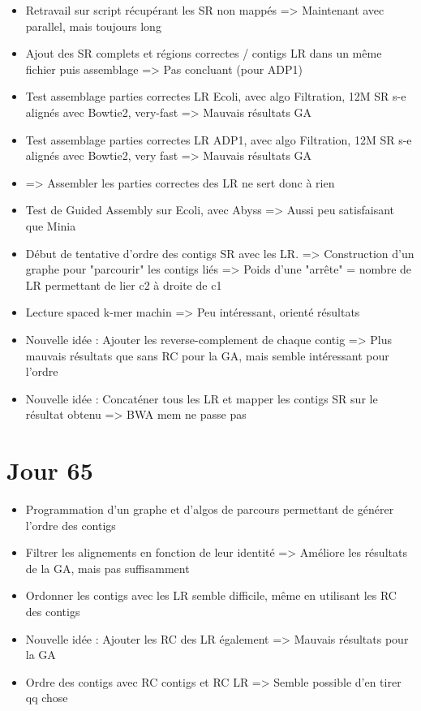 \documentclass[12pt]{report}
\begin{document}
\begin{itemize}
	\item Retravail sur script récupérant les SR non mappés => Maintenant avec parallel, mais toujours long
		  
	\item Ajout des SR complets et régions correctes / contigs LR dans un même fichier puis assemblage => Pas concluant (pour ADP1)
	
	\item Test assemblage parties correctes LR Ecoli, avec algo Filtration, 12M SR s-e alignés avec Bowtie2, very-fast => Mauvais résultats GA
	
	\item Test assemblage parties correctes LR ADP1, avec algo Filtration, 12M SR s-e alignés avec Bowtie2, very fast => Mauvais résultats GA
	
	\item => Assembler les parties correctes des LR ne sert donc à rien
	
	\item Test de Guided Assembly sur Ecoli, avec Abyss => Aussi peu satisfaisant que Minia
		  
	\item Début de tentative d'ordre des contigs SR avec les LR.
		  => Construction d'un graphe pour "parcourir" les contigs liés
		  => Poids d'une "arrête" = nombre de LR permettant de lier c2 à droite de c1 
		  
	\item Lecture spaced k-mer machin => Peu intéressant, orienté résultats
	
	\item Nouvelle idée : Ajouter les reverse-complement de chaque contig => Plus mauvais résultats que sans RC pour la GA, 
		  mais semble intéressant pour l'ordre
	
	\item Nouvelle idée : Concaténer tous les LR et mapper les contigs SR sur le résultat obtenu => BWA mem ne passe pas
\end{itemize}

\section{Jour 65}

\begin{itemize}
	\item Programmation d'un graphe et d'algos de parcours permettant de générer l'ordre des contigs
	
	\item Filtrer les alignements en fonction de leur identité => Améliore les résultats de la GA, mais pas suffisamment 
	
	\item Ordonner les contigs avec les LR semble difficile, même en utilisant les RC des contigs
	
	\item Nouvelle idée : Ajouter les RC des LR également => Mauvais résultats pour la GA
	
	\item Ordre des contigs avec RC contigs et RC LR => Semble possible d'en tirer qq chose
\end{itemize}
\end{document}
